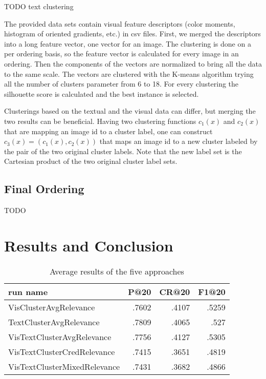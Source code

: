 \documentclass{acm_proc_article-me}
\begin{document}
TODO text clustering

The provided data sets contain visual feature descriptors (color moments, histogram of oriented gradients, etc.) in csv files. First, we merged the descriptors into a long feature vector, one vector for an image. The clustering is done on a per ordering basis, so the feature vector is calculated for every image in an ordering. Then the components of the vectors are normalized to bring all the data to the same scale. The vectors are clustered with the K-means algorithm trying all the number of clusters parameter from 6 to 18. For every clustering the silhouette score \cite{rousseeuw1987silhouettes} is calculated and the best instance is selected.

Clusterings based on the textual and the visual data can differ, but merging the two results can be beneficial. Having two clustering functions $c_1(x)$ and $c_2(x)$ that are mapping an image id to a cluster label, one can construct $c_3(x) = (c_1(x), c_2(x))$ that maps an image id to a new cluster labeled by the pair of the two original cluster labels. Note that the new label set is the Cartesian product of the two original cluster label sets.

\subsection{Final Ordering}

TODO

\section{Results and Conclusion}

\begin{table}[h]
\begin{tabular}{|l|r|r|r|}
	\hline 
	run name & P@20 & CR@20 & F1@20\tabularnewline
	\hline 
	\hline 
	VisClusterAvgRelevance & .7602 & .4107 & .5259\tabularnewline
	\hline 
	TextClusterAvgRelevance & .7809 & .4065 & .527\tabularnewline
	\hline 
	VisTextClusterAvgRelevance & .7756 & .4127 & .5305\tabularnewline
	\hline 
	VisTextClusterCredRelevance & .7415 & .3651 & .4819\tabularnewline
	\hline 
	VisTextClusterMixedRelevance & .7431 & .3682 & .4866\tabularnewline
	\hline 
\end{tabular}
\caption{Average results of the five approaches}
\end{table}

\end{document}
